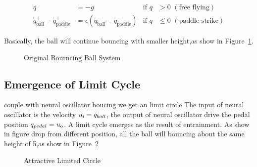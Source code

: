 \begin{align}
\ddot{q}&=-g&\mathrm{if}\,\,q &> 0\,\,\mathrm{(free\,\,flying)} \nonumber\\
\dot{q}^{+}_{\mathrm{ball}} - \dot{q}^{+}_{\mathrm{paddle}} &=  \epsilon(\dot{q}^{-}_{\mathrm{ball}} - \dot{q}^{-}_{\mathrm{paddle}})&\mathrm{if}\,\,q &\leq 0\,\,\mathrm{(paddle\,\,strike)}\nonumber
\end{align}

Basically, the ball will continue bouncing with smaller height,as show in Figure~\ref{fig:bborg}.

\begin{figure}[h]
\begin{center}
	
\end{center}
\caption{Original Bourncing Ball System}
\label{fig:bborg}
\end{figure}



\subsection*{Emergence of Limit Cycle}
couple with neural oscillator boucing we get an limit circle
The input of neural oscillator is the velocity $u_{\mathrm{i}}=\dot{q}_{ball}$, the output of neural oscillator  drive the pedal position $q_{pedal}=u_{\mathrm{o}}$.
A limit cycle emerges as the result of entrainment.
As show in figure drop from different position, all the ball will bouncing  about the same height of 5,as show in Figure~\ref{fig:bb_attractive_circle}

\begin{figure}[h]
\begin{center}
	
\end{center}
\caption{Attractive Limited Circle}
\label{fig:bb_attractive_circle}
\end{figure}

